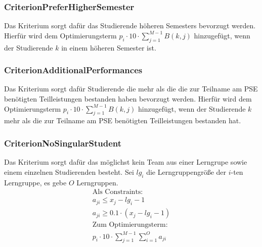 \documentclass[parskip=full]{scrartcl}
\begin{document}
\subsubsection{CriterionPreferHigherSemester}
Das Kriterium sorgt dafür das Studierende höheren Semesters bevorzugt werden.
Hierfür wird dem Optimierungsterm $p_i \cdot 10 \cdot \sum_{j = 1}^{M-1} B(k,j)$ hinzugefügt, wenn der
Studierende $k$ in einem höheren Semester ist.
\subsubsection{CriterionAdditionalPerformances}
Das Kriterium sorgt dafür Studierende die mehr als die die zur Teilname am PSE
benötigten Teilleistungen bestanden haben bevorzugt werden. Hierfür wird dem Optimierungsterm
$p_i \cdot 10 \cdot \sum_{j = 1}^{M-1} B(k,j)$ hinzugefügt, wenn der Studierende
$k$ mehr als die zur Teilname am PSE benötigten Teilleistungen bestanden hat.
\subsubsection{CriterionNoSingularStudent}
Das Kriterium sorgt dafür das möglichst kein Team aus einer Lerngrupe sowie
einem einzelnen Studierenden besteht.
Sei $lg_i$ die Lerngruppengröße der $i$-ten Lerngruppe, es gebe $O$ Lerngruppen.
\begin{gather*}
\text{Als Constraints:} \\
a_{ji} \le x_j -lg_i -1 \\
a_{ji} \ge 0.1 \cdot (x_j -lg_i-1)\\
\text{Zum Optimierungsterm: }\\
p_i \cdot 10 \cdot \sum_{j = 1}^{M-1} \sum_{i = 1}^{O}a_{ji}
\end{gather*}
\end{document}
